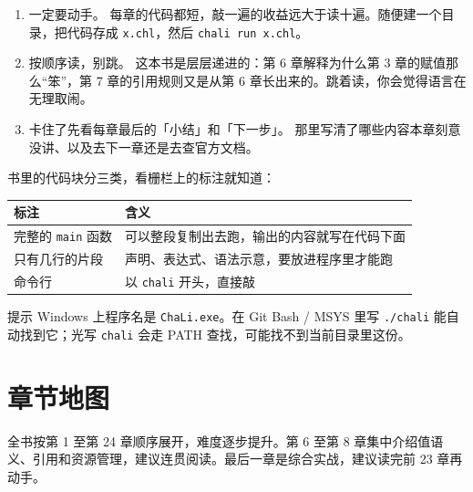 \begin{enumerate}

\item 一定要动手。 每章的代码都短，敲一遍的收益远大于读十遍。随便建一个目录，把代码存成 \texttt{x.\allowbreak{}chl}，然后 \texttt{chali run x.\allowbreak{}chl}。

\item 按顺序读，别跳。 这本书是层层递进的：第 6 章解释为什么第 3 章的赋值那么“笨”，第 7 章的引用规则又是从第 6 章长出来的。跳着读，你会觉得语言在无理取闹。

\item 卡住了先看每章最后的「小结」和「下一步」。 那里写清了哪些内容本章刻意没讲、以及去下一章还是去查官方文档。

\end{enumerate}

书里的代码块分三类，看栅栏上的标注就知道：

\begin{center}
\begin{tabular}{ll}
\toprule
标注 & 含义 \\
\midrule
完整的 \texttt{main} 函数 & 可以整段复制出去跑，输出的内容就写在代码下面 \\
只有几行的片段 & 声明、表达式、语法示意，要放进程序里才能跑 \\
命令行 & 以 \texttt{chali} 开头，直接敲 \\
\bottomrule
\end{tabular}
\end{center}

\begin{tip}{提示}
Windows 上程序名是 \texttt{Cha\allowbreak{}Li.\allowbreak{}exe}。在 Git Bash / MSYS 里写 \texttt{.\allowbreak{}/\allowbreak{}chali} 能自动找到它；光写 \texttt{chali} 会走 PATH 查找，可能找不到当前目录里这份。
\end{tip}

\section*{章节地图}

全书按第 1 至第 24 章顺序展开，难度逐步提升。第 6 至第 8 章集中介绍值语义、引用和资源管理，建议连贯阅读。最后一章是综合实战，建议读完前 23 章再动手。

